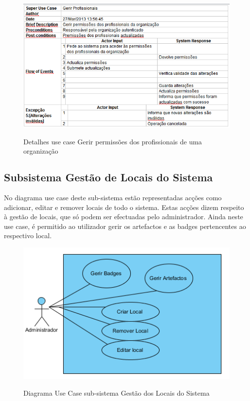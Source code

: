 \documentclass[12pt,a4paper]{article}
\begin{document}
\begin{figure}[h!]
\centering
\includegraphics[scale=0.7]{d_usecase/P_permissoes}
\label{usecase}
\caption{Detalhes use case Gerir permissões dos profissionais de uma organização}
\end{figure}

\clearpage

\subsection{Subsistema Gestão de Locais do Sistema}
No diagrama use case deste sub-sistema estão representadas acções como adicionar, editar e remover locais de todo o sistema. Estas acções dizem respeito à gestão de locais, que só podem ser efectuadas pelo administrador. Ainda neste use case, é permitido ao utilizador gerir os artefactos e as badges pertencentes ao respectivo local.\\

\begin{figure}[h!]
\centering
\includegraphics[scale=1]{usecase/A_GerirLocal}
\label{usecase}
\caption{Diagrama Use Case sub-sistema Gestão dos Locais do Sistema}
\end{figure}
\end{document}
